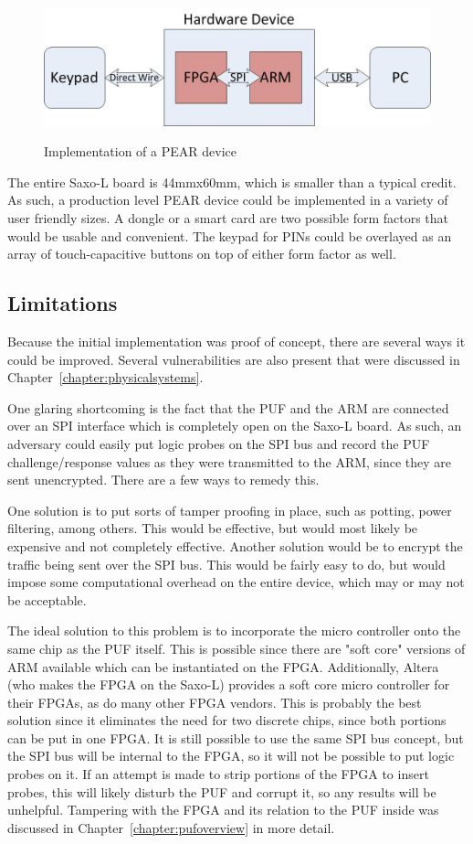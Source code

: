 \begin{figure}[!ht]
\includegraphics[width=500px]{images/pearimpl.jpg}
\label{fig:peararchitecture}
\caption{Implementation of a PEAR device}
\end{figure}
\FloatBarrier

The entire Saxo-L board is 44mmx60mm, which is smaller than a typical credit. As such, a production level PEAR
device could be implemented in a variety of user friendly sizes. A dongle or a smart card are two possible form
factors that would be usable and convenient. The keypad for PINs could be overlayed as an array of touch-capacitive 
buttons on top of either form factor as well.

\subsection{Limitations}
Because the initial implementation was proof of concept, there are several ways it could be improved. Several
vulnerabilities are also present that were discussed in Chapter~\ref{chapter:physicalsystems}.

One glaring shortcoming is the fact that the PUF and the ARM are connected over an SPI interface which is completely
open on the Saxo-L board. As such, an adversary could easily put logic probes on the SPI bus and record the PUF
challenge/response values as they were transmitted to the ARM, since they are sent unencrypted. There are a few
ways to remedy this. 

One solution is to put sorts of tamper proofing in place, such as potting, power filtering, among others. 
This would be effective, but would most likely be expensive and not completely effective. Another solution would
be to encrypt the traffic being sent over the SPI bus. This would be fairly easy to do, but would impose some
computational overhead on the entire device, which may or may not be acceptable. 

The ideal solution to this problem is to incorporate the micro controller onto the same chip as the PUF itself. This
is possible since there are "soft core" versions of ARM available which can be instantiated on the FPGA. Additionally,
Altera (who makes the FPGA on the Saxo-L) provides a soft core micro controller for their FPGAs, as do many other
FPGA vendors. This is probably the best solution since it eliminates the need for two discrete chips, since both portions
can be put in one FPGA. It is still possible to use the same SPI bus concept, but the SPI bus will be internal to the
FPGA, so it will not be possible to put logic probes on it. If an attempt is made to strip portions of the FPGA to
insert probes, this will likely disturb the PUF and corrupt it, so any results will be unhelpful. Tampering with the FPGA
and its relation to the PUF inside was discussed in Chapter~\ref{chapter:pufoverview} in more detail.


